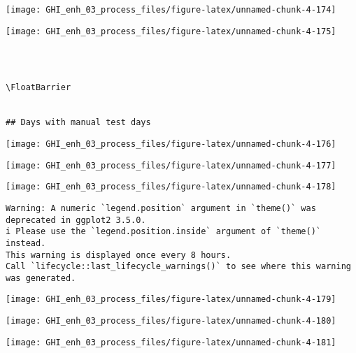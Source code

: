 \documentclass[
  10pt,
  a4paper,oneside]{article}
\begin{document}
\begin{center}\texttt{[image: GHI\_enh\_03\_process\_files/figure-latex/unnamed-chunk-4-174]} \end{center}

\begin{center}\texttt{[image: GHI\_enh\_03\_process\_files/figure-latex/unnamed-chunk-4-175]} \end{center}

\begin{verbatim}
 
 

\FloatBarrier


## Days with manual test days 
\end{verbatim}

\begin{center}\texttt{[image: GHI\_enh\_03\_process\_files/figure-latex/unnamed-chunk-4-176]} \end{center}

\begin{center}\texttt{[image: GHI\_enh\_03\_process\_files/figure-latex/unnamed-chunk-4-177]} \end{center}

\begin{center}\texttt{[image: GHI\_enh\_03\_process\_files/figure-latex/unnamed-chunk-4-178]} \end{center}

\begin{verbatim}
Warning: A numeric `legend.position` argument in `theme()` was deprecated in ggplot2 3.5.0.
i Please use the `legend.position.inside` argument of `theme()` instead.
This warning is displayed once every 8 hours.
Call `lifecycle::last_lifecycle_warnings()` to see where this warning was generated.
\end{verbatim}

\begin{center}\texttt{[image: GHI\_enh\_03\_process\_files/figure-latex/unnamed-chunk-4-179]} \end{center}

\begin{center}\texttt{[image: GHI\_enh\_03\_process\_files/figure-latex/unnamed-chunk-4-180]} \end{center}

\begin{center}\texttt{[image: GHI\_enh\_03\_process\_files/figure-latex/unnamed-chunk-4-181]} \end{center}
\end{document}

